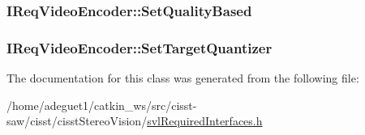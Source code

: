 \hypertarget{class_i_req_video_encoder_a1504d33fbcfbea1d10f206106da74868}{
\subsubsection[{Set\-Quality\-Based}]{ I\-Req\-Video\-Encoder\-::\-Set\-Quality\-Based}}\label{class_i_req_video_encoder_a1504d33fbcfbea1d10f206106da74868}
\hypertarget{class_i_req_video_encoder_a5178233369b251350c538a239477f859}{
\subsubsection[{Set\-Target\-Quantizer}]{ I\-Req\-Video\-Encoder\-::\-Set\-Target\-Quantizer}}\label{class_i_req_video_encoder_a5178233369b251350c538a239477f859}


The documentation for this class was generated from the following file\-:\begin{DoxyCompactItemize}
\item 
/home/adeguet1/catkin\-\_\-ws/src/cisst-\/saw/cisst/cisst\-Stereo\-Vision/\hyperlink{svl_required_interfaces_8h}{svl\-Required\-Interfaces.\-h}\end{DoxyCompactItemize}
